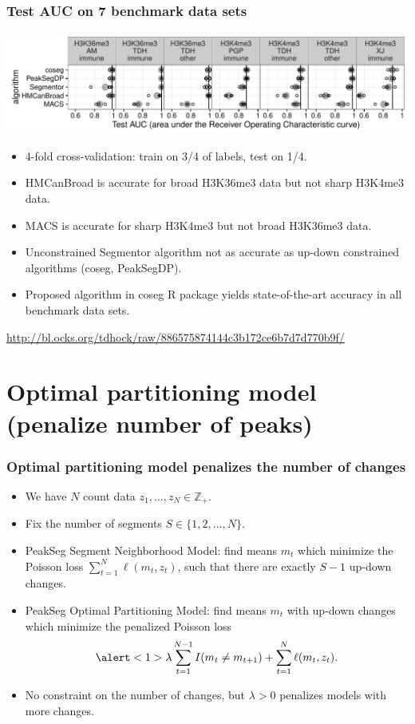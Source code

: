 \documentclass{beamer}
\newcommand{\ZZ}{\mathbb Z}
\begin{document}
\begin{frame}
  \frametitle{Test AUC on 7 benchmark data sets}
  \includegraphics[width=\textwidth]{figure-test-error-dots}
  \begin{itemize}
  \item 4-fold cross-validation: train on 3/4 of labels, test on 1/4.
  \item HMCanBroad is accurate for broad H3K36me3 data but not sharp H3K4me3 data.
  \item MACS is accurate for sharp H3K4me3 but not broad H3K36me3 data.
  \item Unconstrained Segmentor algorithm not as accurate as up-down
    constrained algorithms (coseg, PeakSegDP).
  \item Proposed algorithm in coseg R package yields state-of-the-art
    accuracy in all benchmark data sets.
  \end{itemize}
  \scriptsize
\url{http://bl.ocks.org/tdhock/raw/886575874144c3b172ce6b7d7d770b9f/}
\end{frame}

\section{Optimal partitioning model (penalize number of peaks)}

\begin{frame}
  \frametitle{Optimal partitioning model penalizes the number of changes}
  \begin{itemize}
  \item We have $N$ count data $z_1, \dots, z_N\in\ZZ_+$.
  \item Fix the number of segments $S\in\{1, 2, \dots, N\}$.
  \item PeakSeg Segment Neighborhood Model: find means $m_t$ which
    minimize the Poisson loss $\sum_{t=1}^N \ell(m_t, z_t)$,
    such that there are exactly $S-1$ up-down changes.
  \item PeakSeg Optimal Partitioning Model: find means $m_t$ with
    up-down changes which minimize the \alert<1>{penalized} Poisson
    loss
    $$\alert<1>{\lambda\sum_{t=1}^{N-1}I(m_t\neq m_{t+1})} + \sum_{t=1}^N \ell(m_t, z_t).$$
  \item No constraint on the number of changes, but $\lambda > 0$
    penalizes models with more changes.
  \end{itemize}
\end{frame}
\end{document}
